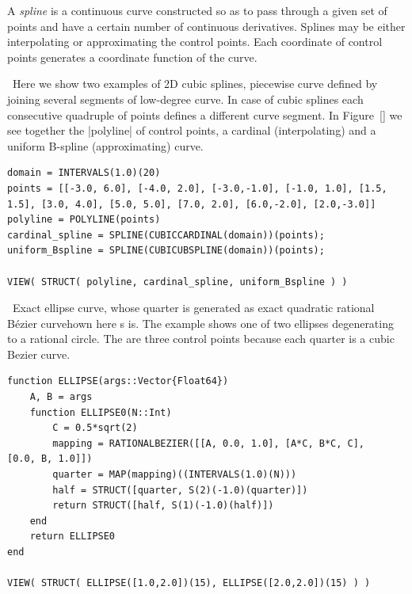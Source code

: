 \begin{coding}[Algebraic computation of FE = $\delta_1$]
{\begin{definition}
A \emph{spline} is a continuous curve constructed so as to pass through a given set of points and have a certain number of continuous derivatives. Splines may be either interpolating or approximating the control points. Each coordinate of control points generates a coordinate function of the curve.
\end{definition}

\begin{condition}\
Here we show two examples of 2D cubic splines, piecewise curve defined by joining several segments of low-degree curve. In case of cubic splines each consecutive quadruple of points defines a different curve segment. In Figure~\ref{} we see together the |polyline|  of control points, a cardinal (interpolating) and a uniform B-spline (approximating) curve.
\begin{lstlisting}[language=JuliaLocal, style=julia, mathescape=true]
domain = INTERVALS(1.0)(20)
points = [[-3.0, 6.0], [-4.0, 2.0], [-3.0,-1.0], [-1.0, 1.0], [1.5, 1.5], [3.0, 4.0], [5.0, 5.0], [7.0, 2.0], [6.0,-2.0], [2.0,-3.0]]
polyline = POLYLINE(points) 
cardinal_spline = SPLINE(CUBICCARDINAL(domain))(points);
uniform_Bspline = SPLINE(CUBICUBSPLINE(domain))(points);

VIEW( STRUCT( polyline, cardinal_spline, uniform_Bspline ) )
\end{lstlisting}
\end{condition}


\begin{condition}[Exact ellipse curve]\
Exact ellipse curve, whose quarter is generated as exact quadratic rational Bézier curvehown here s is. The example shows one of two ellipses degenerating to a rational circle. The are three control points because each quarter is a cubic Bezier curve.
\begin{lstlisting}[language=JuliaLocal, style=julia, mathescape=true]
function ELLIPSE(args::Vector{Float64})
	A, B = args
	function ELLIPSE0(N::Int)
		C = 0.5*sqrt(2)
		mapping = RATIONALBEZIER([[A, 0.0, 1.0], [A*C, B*C, C], 		[0.0, B, 1.0]])
		quarter = MAP(mapping)((INTERVALS(1.0)(N)))
		half = STRUCT([quarter, S(2)(-1.0)(quarter)])
		return STRUCT([half, S(1)(-1.0)(half)])
	end
	return ELLIPSE0
end

VIEW( STRUCT( ELLIPSE([1.0,2.0])(15), ELLIPSE([2.0,2.0])(15) ) )
\end{lstlisting}
\end{condition}

}
\end{coding}
